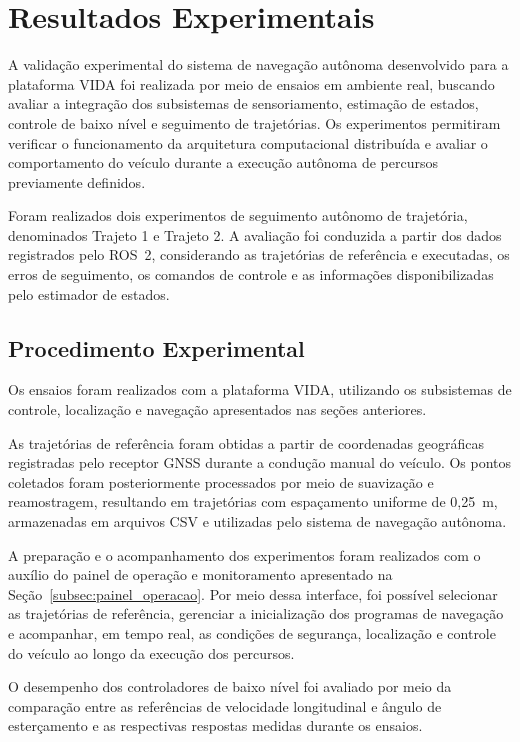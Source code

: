 \section{Resultados Experimentais}
\label{sec:resultados_experimentais}

A validação experimental do sistema de navegação autônoma desenvolvido para a plataforma VIDA foi realizada por meio de ensaios em ambiente real, buscando avaliar a integração dos subsistemas de sensoriamento, estimação de estados, controle de baixo nível e seguimento de trajetórias. Os experimentos permitiram verificar o funcionamento da arquitetura computacional distribuída e avaliar o comportamento do veículo durante a execução autônoma de percursos previamente definidos.

Foram realizados dois experimentos de seguimento autônomo de trajetória, denominados Trajeto 1 e Trajeto 2. A avaliação foi conduzida a partir dos dados registrados pelo ROS~2, considerando as trajetórias de referência e executadas, os erros de seguimento, os comandos de controle e as informações disponibilizadas pelo estimador de estados.

\subsection{Procedimento Experimental}
\label{subsec:procedimento_experimental}

Os ensaios foram realizados com a plataforma VIDA, utilizando os subsistemas de controle, localização e navegação apresentados nas seções anteriores.

As trajetórias de referência foram obtidas a partir de coordenadas geográficas registradas pelo receptor GNSS durante a condução manual do veículo. Os pontos coletados foram posteriormente processados por meio de suavização e reamostragem, resultando em trajetórias com espaçamento uniforme de 0,25~m, armazenadas em arquivos CSV e utilizadas pelo sistema de navegação autônoma.

A preparação e o acompanhamento dos experimentos foram realizados com o auxílio do painel de operação e monitoramento apresentado na Seção~\ref{subsec:painel_operacao}. Por meio dessa interface, foi possível selecionar as trajetórias de referência, gerenciar a inicialização dos programas de navegação e acompanhar, em tempo real, as condições de segurança, localização e controle do veículo ao longo da execução dos percursos.

O desempenho dos controladores de baixo nível foi avaliado por meio da comparação entre as referências de velocidade longitudinal e ângulo de esterçamento e as respectivas respostas medidas durante os ensaios.

